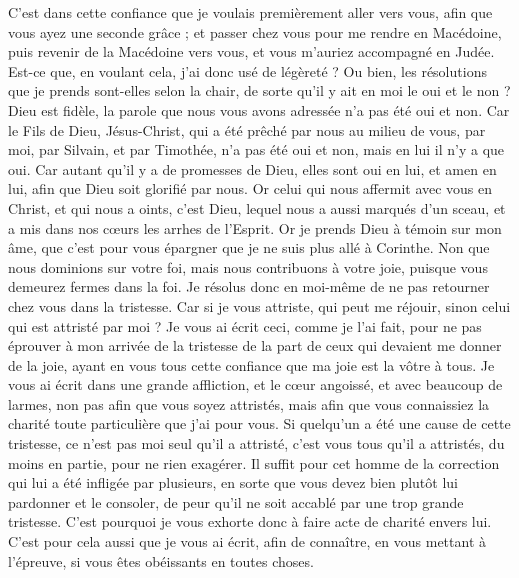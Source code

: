 \begin{multicols}{2}
C’est dans cette confiance que je voulais premièrement aller vers vous, afin que vous ayez une seconde grâce ;
et passer chez vous pour me rendre en Macédoine, puis revenir de la Macédoine vers vous, et vous m’auriez accompagné en Judée.
Est-ce que, en voulant cela, j’ai donc usé de légèreté ? Ou bien, les résolutions que je prends sont-elles selon la chair, de sorte qu’il y ait en moi le oui et le non ?
Dieu est fidèle, la parole que nous vous avons adressée n’a pas été oui et non.
Car le Fils de Dieu, Jésus-Christ, qui a été prêché par nous au milieu de vous, par moi, par Silvain, et par Timothée, n'a pas été oui et non, mais en lui il n’y a que oui.
Car autant qu’il y a de promesses de Dieu, elles sont oui en lui, et amen en lui, afin que Dieu soit glorifié par nous.
Or celui qui nous affermit avec vous en Christ, et qui nous a oints, c'est Dieu,
lequel nous a aussi marqués d’un sceau, et a mis dans nos cœurs les arrhes de l'Esprit.
Or je prends Dieu à témoin sur mon âme, que c’est pour vous épargner que je ne suis plus allé à Corinthe.
Non que nous dominions sur votre foi, mais nous contribuons à votre joie, puisque vous demeurez fermes dans la foi.
\VerseOne{}Je résolus donc en moi-même de ne pas retourner chez vous dans la tristesse.
Car si je vous attriste, qui peut me réjouir, sinon celui qui est attristé par moi ?
Je vous ai écrit ceci, comme je l’ai fait, pour ne pas éprouver à mon arrivée de la tristesse de la part de ceux qui devaient me donner de la joie, ayant en vous tous cette confiance que ma joie est la vôtre à tous.
Je vous ai écrit dans une grande affliction, et le cœur angoissé, et avec beaucoup de larmes, non pas afin que vous soyez attristés, mais afin que vous connaissiez la charité toute particulière que j'ai pour vous.
Si quelqu'un a été une cause de cette tristesse, ce n'est pas moi seul qu'il a attristé, c'est vous tous qu'il a attristés, du moins en partie, pour ne rien exagérer.
Il suffit pour cet homme de la correction qui lui a été infligée par plusieurs,
en sorte que vous devez bien plutôt lui pardonner et le consoler, de peur qu’il ne soit accablé par une trop grande tristesse.
C'est pourquoi je vous exhorte donc à faire acte de charité envers lui.
C’est pour cela aussi que je vous ai écrit, afin de connaître, en vous mettant à l’épreuve, si vous êtes obéissants en toutes choses.

\end{multicols}

